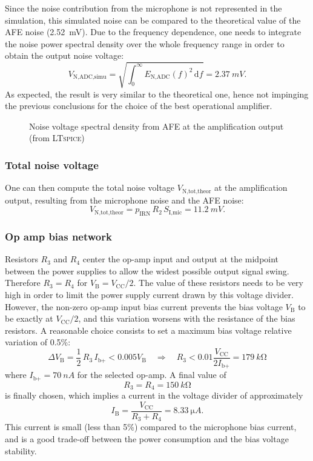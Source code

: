 \documentclass{EPL-master-thesis-covers-EN}
\newcommand{\te}[1]{\textrm{#1}}
\begin{document}
Since the noise contribution from the microphone is not represented in the simulation, this simulated noise can be compared to the theoretical value of the AFE noise (\SI{2.52}{mV}). Due to the frequency dependence, one needs to integrate the noise power spectral density over the whole frequency range in order to obtain the output noise voltage:
\[
 V_\te{N,ADC,simu} = \sqrt{\int_{0}^{\infty} E_\te{N,ADC}(f)^2 \, \te{d}f} = \SI{2.37}{mV}.
\]
As expected, the result is very similar to the theoretical one, hence not impinging the previous conclusions for the choice of the best operational amplifier.


\begin{figure}[H]
    \centering
    
    \caption{Noise voltage spectral density from AFE at the amplification output (from \textsc{LTspice})}
    \label{fig:output_noise_op_amp_freq}
\end{figure}

\subsubsection*{Total noise voltage}

One can then compute the total noise voltage $V_\te{N,tot,theor}$ at the amplification output, resulting from the microphone noise and the AFE noise:
\[
 V_\te{N,tot,theor} = p_\te{IRN} \, R_2\,S_{\te{I,mic}} = \SI{11.2}{mV}.
\]


\subsubsection*{Op amp bias network}

Resistors $R_3$ and $R_4$ center the op-amp input and output at the midpoint between the power supplies to allow the widest possible output signal swing. Therefore $R_3 = R_4$ for $V_\te{B} = V_\te{CC} / 2$. The value of these resistors needs to be very high in order to limit the power supply current drawn by this voltage divider. However, the non-zero op-amp input bias current prevents the bias voltage $V_\te{B}$ to be exactly at $V_\te{CC} / 2$, and this variation worsens with the resistance of the bias resistors. A reasonable choice consists to set a maximum bias voltage relative variation of 0.5\%:
\[
 \Delta V_\te{B} = \frac{1}{2} \, R_3 \, I_\te{b+} < 0.005 V_\te{B} \quad \Rightarrow \quad R_3 < 0.01 \frac{V_\te{CC}}{2I_\te{b+}} = \SI{179}{k\ohm}
\]
where $I_\te{b+} = \SI{70}{nA}$ for the selected op-amp. A final value of
\[
 R_3 = R_4 = \SI{150}{k\ohm}
\]
is finally chosen, which implies a current in the voltage divider of approximately
\[
 I_\te{B} = \frac{V_\te{CC}}{R_3 + R_4} = \SI{8.33}{\micro A}.
\]
This current is small (less than 5\%) compared to the microphone bias current, and is a good trade-off between the power consumption and the bias voltage stability.
\end{document}
